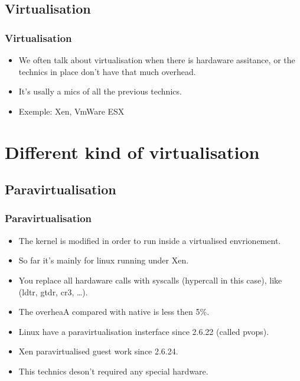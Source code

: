 \subsection{Virtualisation}
\begin{frame}
\frametitle{Virtualisation}
\begin{itemize}
\item We often talk about virtualisation when there is hardaware
assitance, or the technics in place don't have that much overhead.
\item It's usally a mics of all the previous technics.
\item Exemple: Xen, VmWare ESX
\end{itemize}
\end{frame}

\section{Different kind of virtualisation}
\subsection{Paravirtualisation}
\begin{frame}
\frametitle{Paravirtualisation}
\begin{itemize}
\item The kernel is modified in order to run inside a virtualised
envrionement.
\item So far it's mainly for linux running under Xen.
\item You replace all hardaware calls with syscalls (hypercall in this
case), like (ldtr, gtdr, cr3, \ldots ).
\item The overheaA compared with native is less then 5\%.
\item Linux have a paravirtualisation insterface since 2.6.22 (called
pvops).
\item Xen paravirtualised guest work since 2.6.24.
\item This technics deson't required any special hardware.
\end{itemize}
\end{frame}

